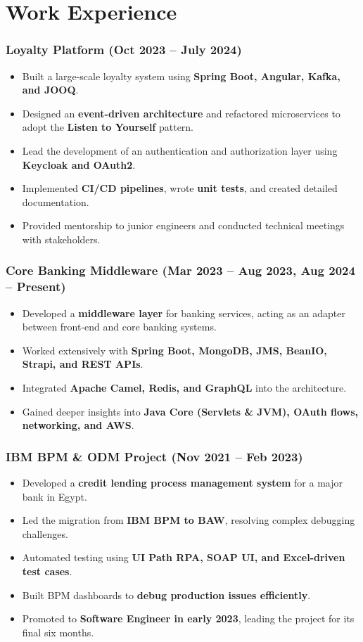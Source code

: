 \documentclass[a4paper,11pt]{article}
\begin{document}
\section*{Work Experience}

\subsubsection*{Loyalty Platform (Oct 2023 – July 2024)}
\begin{itemize}
    \item Built a large-scale loyalty system using \textbf{Spring Boot, Angular, Kafka, and JOOQ}.
    \item Designed an \textbf{event-driven architecture} and refactored microservices to adopt the \textbf{Listen to Yourself} pattern.
    \item Lead the development of an authentication and authorization layer using \textbf{Keycloak and OAuth2}.
    \item Implemented \textbf{CI/CD pipelines}, wrote \textbf{unit tests}, and created detailed documentation.
    \item Provided mentorship to junior engineers and conducted technical meetings with stakeholders.
\end{itemize}

\subsubsection*{Core Banking Middleware (Mar 2023 – Aug 2023, Aug 2024 – Present)}
\begin{itemize}
    \item Developed a \textbf{middleware layer} for banking services, acting as an adapter between front-end and core banking systems.
    \item Worked extensively with \textbf{Spring Boot, MongoDB, JMS, BeanIO, Strapi, and REST APIs}.
    \item Integrated \textbf{Apache Camel, Redis, and GraphQL} into the architecture.
    \item Gained deeper insights into \textbf{Java Core (Servlets \& JVM), OAuth flows, networking, and AWS}.
\end{itemize}

\subsubsection*{IBM BPM \& ODM Project (Nov 2021 – Feb 2023)}
\begin{itemize}
    \item Developed a \textbf{credit lending process management system} for a major bank in Egypt.
    \item Led the migration from \textbf{IBM BPM to BAW}, resolving complex debugging challenges.
    \item Automated testing using \textbf{UI Path RPA, SOAP UI, and Excel-driven test cases}.
    \item Built BPM dashboards to \textbf{debug production issues efficiently}.
    \item Promoted to \textbf{Software Engineer in early 2023}, leading the project for its final six months.
\end{itemize}
\end{document}
